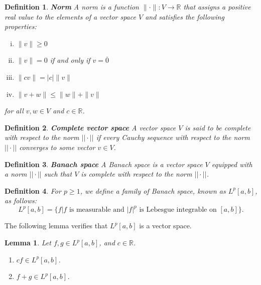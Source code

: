 \documentclass[12pt]{amsart}
\newtheorem{definition}{Definition}
\theoremstyle{plain}
\newtheorem{lemma}[thm]{Lemma}
\theoremstyle{definition}
\theoremstyle{remark}
\numberwithin{equation}{section}
\numberwithin{thm}{section}
\begin{document}
\begin{definition}
\textbf{Norm}    
A norm is a function $\|\cdot\| : V \to \mathbb{R}$ that assigns a positive real value to the elements of a vector space $V$ and satisfies the following properties:

\begin{enumerate}[i.]
    \item $\|v\| \geq 0$
    \item $\|v\| = 0$ if and only if $v=\overline{0}$
    \item $\|cv\| = |c|\|v\|$
    \item $\|v+w\| \leq \|w\|+\|v\|$
\end{enumerate}
for all $v, w \in V$ and $c \in \mathbb{R}$.
\end{definition}
\begin{definition}
\textbf{Complete vector space}  
A vector space $V$ is said to be complete with respect to the norm $||\cdot||$ if every Cauchy sequence with respect to the norm $||\cdot||$ converges to some vector $v \in V$. 
\end{definition}

\begin{definition}
\textbf{Banach space}
A Banach space is a vector space $V$ equipped with a norm $||\cdot||$ such that $V$ is complete with respect to the norm $||\cdot||$.    
\end{definition}
\begin{definition}
For $p \geq 1$, we define a family of Banach space, known as $L^p[a,b]$, as follows:
    \[
    L^p[a,b] = \{ f | f \text{ is measurable and } |f|^p \text{ is Lebesgue integrable on } [a,b]\}.
    \]
\end{definition}

The following lemma verifies that $L^p[a,b]$ is a vector space. 

\begin{lemma}
\label{LpVectorSpace}
Let $f,g \in L^p[a, b]$, and $c \in \mathbb{R}$.
\begin{enumerate}
    \item[(i)] $cf \in L^p[a, b]$.
    \item[(ii)] $f + g \in L^p[a, b]$.
\end{enumerate}
\end{lemma}
\end{document}
